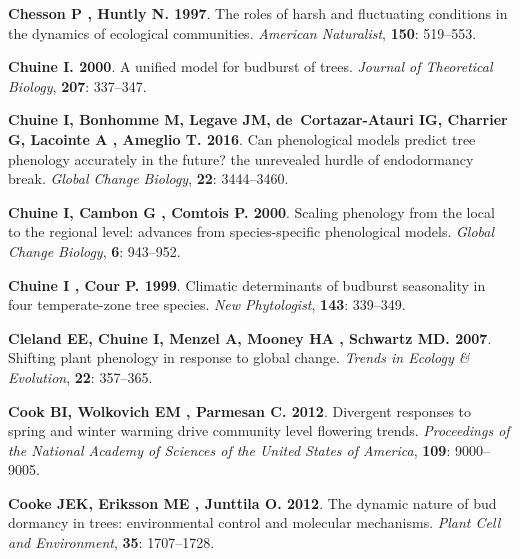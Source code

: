 \documentclass[11pt]{article}
\begin{document}
\begin{thebibliography}{69}
{\bf Chesson P , Huntly N}{\bf . 1997}.
\newblock The roles of harsh and fluctuating conditions in the dynamics of
  ecological communities.
\newblock \emph{American Naturalist}, {\bf 150}: 519--553.

{\bf Chuine I}{\bf . 2000}.
\newblock A unified model for budburst of trees.
\newblock \emph{Journal of Theoretical Biology}, {\bf 207}: 337--347.

{\bf Chuine I, Bonhomme M, Legave JM, de~Cortazar-Atauri IG, Charrier G,
  Lacointe A , Ameglio T}{\bf . 2016}.
\newblock Can phenological models predict tree phenology accurately in the
  future? the unrevealed hurdle of endodormancy break.
\newblock \emph{Global Change Biology}, {\bf 22}: 3444--3460.

{\bf Chuine I, Cambon G , Comtois P}{\bf . 2000}.
\newblock Scaling phenology from the local to the regional level: advances from
  species-specific phenological models.
\newblock \emph{Global Change Biology}, {\bf 6}: 943--952.

{\bf Chuine I , Cour P}{\bf . 1999}.
\newblock Climatic determinants of budburst seasonality in four temperate-zone
  tree species.
\newblock \emph{New Phytologist}, {\bf 143}: 339--349.

{\bf Cleland EE, Chuine I, Menzel A, Mooney HA , Schwartz MD}{\bf . 2007}.
\newblock Shifting plant phenology in response to global change.
\newblock \emph{Trends in Ecology \& Evolution}, {\bf 22}: 357--365.

{\bf Cook BI, Wolkovich EM , Parmesan C}{\bf . 2012}.
\newblock Divergent responses to spring and winter warming drive community
  level flowering trends.
\newblock \emph{Proceedings of the National Academy of Sciences of the United
  States of America}, {\bf 109}: 9000--9005.

{\bf Cooke JEK, Eriksson ME , Junttila O}{\bf . 2012}.
\newblock The dynamic nature of bud dormancy in trees: environmental control
  and molecular mechanisms.
\newblock \emph{Plant Cell and Environment}, {\bf 35}: 1707--1728.


\end{thebibliography}
\end{document}
